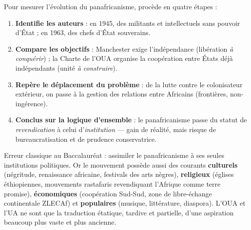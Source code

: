 \documentclass[11pt]{article}
\begin{document}
\begin{methode}
Pour mesurer l'évolution du panafricanisme, procède en quatre étapes :
\begin{enumerate}
\item \textbf{Identifie les auteurs} : en 1945, des militants et intellectuels sans pouvoir d'État ; en 1963, des chefs d'État souverains.
\item \textbf{Compare les objectifs} : Manchester exige l'indépendance (libération \emph{à conquérir}) ; la Charte de l'OUA organise la coopération entre États déjà indépendants (unité \emph{à construire}).
\item \textbf{Repère le déplacement du problème} : de la lutte contre le colonisateur extérieur, on passe à la gestion des relations entre Africains (frontières, non-ingérence).
\item \textbf{Conclus sur la logique d'ensemble} : le panafricanisme passe du statut de \emph{revendication} à celui d'\emph{institution} — gain de réalité, mais risque de bureaucratisation et de prudence conservatrice.
\end{enumerate}
\end{methode}

\begin{attention}
Erreur classique au Baccalauréat : assimiler le panafricanisme à ses seules institutions politiques. Or le mouvement possède aussi des courants \textbf{culturels} (négritude, renaissance africaine, festivals des arts nègres), \textbf{religieux} (églises éthiopiennes, mouvements rastafaris revendiquant l'Afrique comme terre promise), \textbf{économiques} (coopération Sud-Sud, zone de libre-échange continentale ZLECAf) et \textbf{populaires} (musique, littérature, diaspora). L'OUA et l'UA ne sont que la traduction étatique, tardive et partielle, d'une aspiration beaucoup plus vaste et plus ancienne.
\end{attention}
\end{document}
